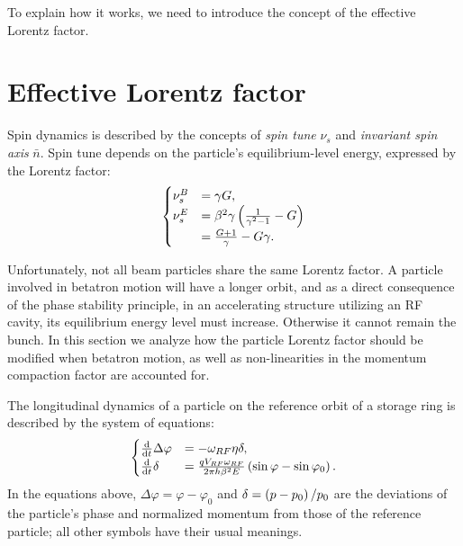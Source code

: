 \documentclass[]{elsarticle}
\newcommand{\w}{\omega}
\newcommand{\nbar}{\bar n}
\newcommand{\D}{\Delta}
\begin{document}
To explain how it works, we need to introduce the concept of the effective Lorentz factor.

\section{Effective Lorentz factor}
Spin dynamics is described by the concepts of \emph{spin tune} $\nu_s$ and \emph{invariant spin axis} $\nbar$.
Spin tune depends on the particle's  equilibrium-level energy, expressed by the Lorentz factor:
\begin{equation}\label{eq:spin_tune_vs_gamma}
  \begin{cases}
    \nu_s^B &= \gamma G, \\
    \nu_s^E &= \beta^2\gamma\bkt{\frac{1}{\gamma^2-1} - G} \\
    &= \frac{G+1}{\gamma} - G\gamma.
  \end{cases}
\end{equation}

Unfortunately, not all beam particles share the same Lorentz factor. A particle involved in betatron
motion will have a longer orbit, and as a direct consequence of the phase stability principle,
in an accelerating structure utilizing an RF cavity, its equilibrium energy level 
must increase. Otherwise it cannot remain the bunch. In this section we analyze how the particle Lorentz factor
should be modified when betatron motion, as well as non-linearities in the momentum compaction factor are
accounted for.

The longitudinal dynamics of a particle on the reference orbit of a storage ring is described
by the system of equations:
\begin{equation}
  \begin{cases}
    \ddt{}\D\varphi &= -\w_{RF}\eta\delta, \\
    \ddt{}\delta &= \frac{q V_{RF}\w_{RF}}{2\pi h\beta^2E}\bkt{\sin\varphi - \sin\varphi_0}.
  \end{cases}
\end{equation}
In the equations above, $\D\varphi = \varphi - \varphi_0$ and
$\delta = \bkt{p-p_0}/{p_0}$ are the deviations of the particle's phase and
normalized momentum from those of the reference particle; all other symbols have their usual meanings.
\end{document}
